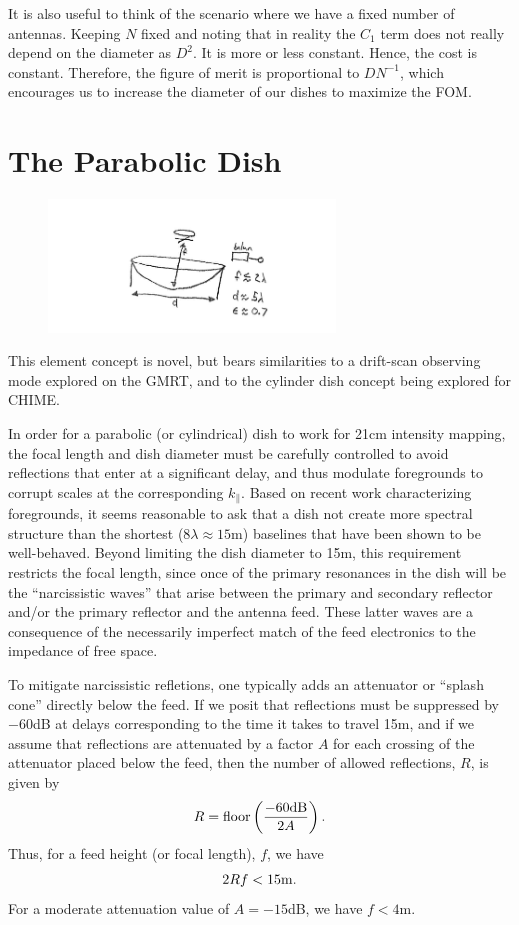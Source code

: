 \documentclass[11pt]{article}
\begin{document}
It is also useful to think of the scenario where we have a fixed number of
antennas. Keeping $N$ fixed and noting that in reality the $C_{1}$ term does not
really depend on the diameter as $D^{2}$. It is more or less constant. Hence,
the cost is constant. Therefore, the figure of merit is proportional to
$DN^{-1}$, which encourages us to increase the diameter of our dishes to
maximize the FOM.

\section{The Parabolic Dish}

\begin{figure}[!b]
\centering
\includegraphics[width=3in]{dish_plots/eor_dish.png}
\caption{}
\label{fig:element_dish}
\end{figure}

This element concept is novel, but bears similarities to a drift-scan observing
mode explored on the GMRT, and to the cylinder dish concept being explored for
CHIME.  

In order for a parabolic (or cylindrical) dish to work for 21cm intensity
mapping, the focal length and dish diameter must be carefully controlled to
avoid reflections that enter at a significant delay, and thus modulate
foregrounds to corrupt scales at the corresponding $k_\parallel$.  Based on
recent work characterizing foregrounds, it seems reasonable to ask that a dish
not create more spectral structure than the shortest ($8\lambda\approx15$m)
baselines that have been shown to be well-behaved.  Beyond limiting the dish
diameter to 15m, this requirement restricts the focal length, since once of the
primary resonances in the dish will be the ``narcissistic waves'' that arise
between the primary and secondary reflector and/or the primary reflector and the
antenna feed.  These latter waves are a consequence of the necessarily imperfect
match of the feed electronics to the impedance of free space.

To mitigate narcissistic refletions, one typically adds an attenuator or
``splash cone'' directly below the feed.  If we posit that reflections must be
suppressed by $-60$dB at delays corresponding to the time it takes to travel
15m, and if we assume that reflections are attenuated by a factor $A$ for each
crossing of the attenuator placed below the feed, then the number of allowed
reflections, $R$, is given by
\begin{equation}
R={\rm floor}\left(\frac{-60{\rm dB}}{2A}\right).
\end{equation}
Thus, for a feed height (or focal length), $f$, we have
\begin{equation}
2Rf<15{\rm m}.
\end{equation}
For a moderate attenuation value of $A=-15$dB, we have $f<4$m.
\end{document}
